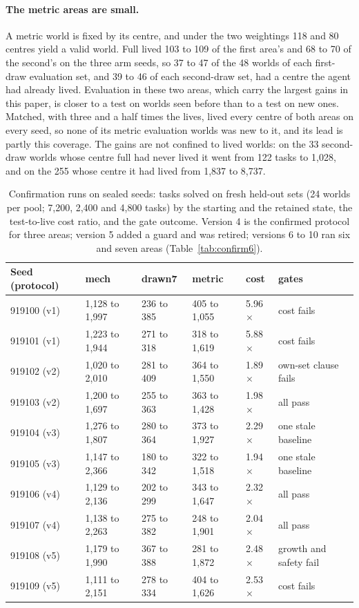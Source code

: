 \documentclass[11pt]{article}
\begin{document}
\paragraph{The metric areas are small.} A metric world is fixed by its centre, and under the two weightings 118 and 80 centres yield a valid world. Full lived 103 to 109 of the first area's and 68 to 70 of the second's on the three arm seeds, so 37 to 47 of the 48 worlds of each first-draw evaluation set, and 39 to 46 of each second-draw set, had a centre the agent had already lived. Evaluation in these two areas, which carry the largest gains in this paper, is closer to a test on worlds seen before than to a test on new ones. Matched, with three and a half times the lives, lived every centre of both areas on every seed, so none of its metric evaluation worlds was new to it, and its lead is partly this coverage. The gains are not confined to lived worlds: on the 33 second-draw worlds whose centre full had never lived it went from 122 tasks to 1,028, and on the 255 whose centre it had lived from 1,837 to 8,737.

\begin{table}[t]
\centering
\caption{Confirmation runs on sealed seeds: tasks solved on fresh held-out sets (24 worlds per pool; 7,200, 2,400 and 4,800 tasks) by the starting and the retained state, the test-to-live cost ratio, and the gate outcome. Version 4 is the confirmed protocol for three areas; version 5 added a guard and was retired; versions 6 to 10 ran six and seven areas (Table~\ref{tab:confirm6}).}
\label{tab:confirm}
\footnotesize
\begin{tabular}{llllll}
\toprule
Seed (protocol) & mech & drawn7 & metric & cost & gates \\
\midrule
919100 (v1) & 1,128 to 1,997 & 236 to 385 & 405 to 1,055 & 5.96$\times$ & cost fails \\
919101 (v1) & 1,223 to 1,944 & 271 to 318 & 318 to 1,619 & 5.88$\times$ & cost fails \\
919102 (v2) & 1,020 to 2,010 & 281 to 409 & 364 to 1,550 & 1.89$\times$ & own-set clause fails \\
919103 (v2) & 1,200 to 1,697 & 255 to 363 & 363 to 1,428 & 1.98$\times$ & all pass \\
919104 (v3) & 1,276 to 1,807 & 280 to 364 & 373 to 1,927 & 2.29$\times$ & one stale baseline \\
919105 (v3) & 1,147 to 2,366 & 180 to 342 & 322 to 1,518 & 1.94$\times$ & one stale baseline \\
919106 (v4) & 1,129 to 2,136 & 202 to 299 & 343 to 1,647 & 2.32$\times$ & all pass \\
919107 (v4) & 1,138 to 2,263 & 275 to 382 & 248 to 1,901 & 2.04$\times$ & all pass \\
919108 (v5) & 1,179 to 1,990 & 367 to 388 & 281 to 1,872 & 2.48$\times$ & growth and safety fail \\
919109 (v5) & 1,111 to 2,151 & 278 to 334 & 404 to 1,626 & 2.53$\times$ & cost fails \\
\bottomrule
\end{tabular}
\end{table}
\end{document}
